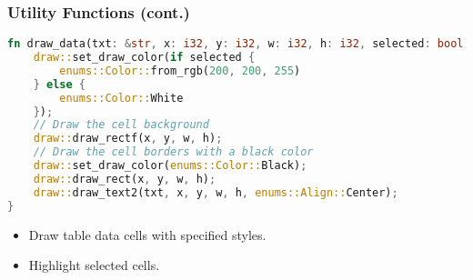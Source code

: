\documentclass[aspectratio=169, table]{beamer}
\begin{document}
\begin{frame}[fragile]
\frametitle{Utility Functions (cont.)}
\vspace{15pt}
\begin{lstlisting}[language=Rust]
fn draw_data(txt: &str, x: i32, y: i32, w: i32, h: i32, selected: bool) {
	draw::set_draw_color(if selected {
		enums::Color::from_rgb(200, 200, 255)
	} else {
		enums::Color::White
	});
	// Draw the cell background
	draw::draw_rectf(x, y, w, h);
	// Draw the cell borders with a black color
	draw::set_draw_color(enums::Color::Black);
	draw::draw_rect(x, y, w, h);
	draw::draw_text2(txt, x, y, w, h, enums::Align::Center);
}
\end{lstlisting}
\begin{itemize}
\item Draw table data cells with specified styles.
\item Highlight selected cells.
\end{itemize}
\end{frame}
\end{document}
